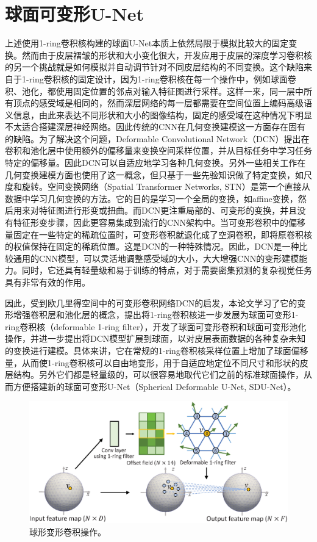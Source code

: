 \section{球面可变形U-Net}
上述使用1-ring卷积核构建的球面U-Net本质上依然局限于模拟比较大的固定变换\cite{dai2017deformable}。然而由于皮层褶皱的形状和大小变化很大，开发应用于皮层的深度学习卷积核的另一个挑战就是如何模拟并自动调节针对不同皮层结构的不同变换。这个缺陷来自于1-ring卷积核的固定设计，因为1-ring卷积核在每一个操作中，例如球面卷积、池化，都使用固定位置的邻点对输入特征图进行采样。这样一来，同一层中所有顶点的感受域是相同的，然而深层网络的每一层都需要在空间位置上编码高级语义信息，由此来表达不同形状和大小的图像结构，固定的感受域在这种情况下明显不太适合搭建深层神经网络。因此传统的CNN在几何变换建模这一方面存在固有的缺陷。为了解决这个问题，Deformable Convolutional Network（DCN）\cite{dai2017deformable}提出在卷积和池化层中使用额外的偏移量来变换空间采样位置，并从目标任务中学习任务特定的偏移量。因此DCN可以自适应地学习各种几何变换。另外一些相关工作在几何变换建模方面也使用了这一概念，但只基于一些先验知识做了特定变换，如尺度\cite{xu2014scale}和旋转\cite{worrall2017harmonic}。空间变换网络（Spatial Transformer Networks, STN）\cite{jaderberg2015spatial}是第一个直接从数据中学习几何变换的方法。它的目的是学习一个全局的变换，如affine变换，然后用来对特征图进行形变或扭曲。而DCN更注重局部的、可变形的变换，并且没有特征形变步骤，因此更容易集成到流行的CNN架构中。当可变形卷积中的偏移量固定在一些特定的稀疏位置时，可变形卷积就退化成了空洞卷积\cite{chen2017rethinking}，即将原卷积核的权值保持在固定的稀疏位置。这是DCN的一种特殊情况。因此，DCN是一种比较通用的CNN模型，可以灵活地调整感受域的大小，大大增强CNN的变形建模能力。同时，它还具有轻量级和易于训练的特点，对于需要密集预测的复杂视觉任务具有非常有效的作用\cite{dai2017deformable}。

因此，受到欧几里得空间中的可变形卷积网络DCN\cite{dai2017deformable}的启发，本论文学习了它的变形增强卷积层和池化层的概念，提出将1-ring卷积核进一步发展为球面可变形1-ring卷积核（deformable 1-ring filter），开发了球面可变形卷积和球面可变形池化操作，并进一步提出将DCN模型扩展到球面，以对皮层表面数据的各种复杂未知的变换进行建模。具体来讲，它在常规的1-ring卷积核采样位置上增加了球面偏移量，从而使1-ring卷积核可以自由地变形，用于自适应地定位不同尺寸和形状的皮层结构。另外它们都是轻量级的，可以很容易地取代它们之前的标准球面操作，从而方便搭建新的球面可变形U-Net（Spherical Deformable U-Net, SDU-Net）。

\begin{figure}[t]
	\centering
	\includegraphics[width=0.85\linewidth]{figure/spheircal_deform_conv.eps}
	\caption{球形变形卷积操作。}
	\label{fig:fig_deform_conv}
\end{figure}


